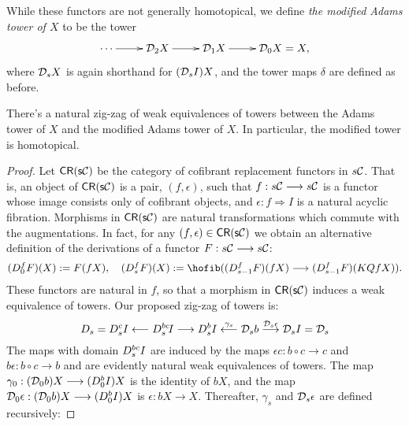 \documentclass[11pt]{amsart}
\theoremstyle{plain}
\newcommand{\caldup}[1]{\calD_{\smash{#1}}}
\begin{document}
While these functors are not generally homotopical, we define \emph{the modified Adams tower of $X$} to be the tower
\[\xymatrix@R=4mm{
\cdots 
\ar[r]
&%
\caldup{2}X
\ar[r]
&%
\caldup{1}X
\ar[r]&%
\caldup{0}X=X,
}\]
where $\caldup{s}X$ is again shorthand for $(\caldup{s}I)X$, and the tower maps $\delta$ are defined as before.
\begin{prop}\label{prop:modifiedAdamsTower}
There's a natural zig-zag of weak equivalences of towers between the Adams tower of $X$ and the modified Adams tower of $X$. In particular, the modified tower is homotopical.
\end{prop}
\begin{proof}
Let $\mathsf{CR(s\calC)}$ be the category of cofibrant replacement functors in $s\calC$. That is, an object of $\mathsf{CR(s\calC)}$ is a pair, $(f,\epsilon)$, such that $f:s\calC\to s\calC$ is a functor whose image consists only of cofibrant objects, and $\epsilon:f\Rightarrow I$ is a natural acyclic fibration. Morphisms in $\mathsf{CR(s\calC)}$ are natural transformations which commute with the augmentations. In fact, for any $(f,\epsilon)\in\mathsf{CR(s\calC)}$ we obtain an alternative definition of the derivations of a functor $F:s\calC\to s\calC$:
\begin{alignat*}{2}
(D_{\smash{0}}^{\smash{f}}F)(X)
:=
F(fX),\quad %
(D_{\smash{s}}^{\smash{f}}F)(X)
:=
\hofib((D_{\smash{s-1}}^{\smash{f}}F)(fX)\to (D_{\smash{s-1}}^{\smash{f}}F)(KQfX)).
\end{alignat*}
These functors are natural in $f$, so that a morphism in $\mathsf{CR(s\calC)}$ induces a weak equivalence of towers. Our proposed zig-zag of towers is: %
\[D_{\smash{s}}= D_{\smash{s}}^{\smash{c}}I\overset{}{\from}D_{\smash{s}}^{\smash{b\circ c}}\!I\overset{}{\to}D_{\smash{s}}^{\smash{b}}I\overset{\gamma_s}{\from}\caldup{s}b\overset{\caldup{s}\epsilon}{\to}\caldup{s}I=\caldup{s}\]
The maps with domain $D_{\smash{s}}^{\smash{b\circ c}}I$ are induced by the maps $\epsilon c:b\circ c\to c$ and $b\epsilon:b\circ c\to b$ and are evidently natural weak equivalences of towers. The map $\gamma_0:(\caldup{0}b)X\to (D_{\smash{0}}^{\smash{b}}I)X$ is the identity of $bX$, and the map $\caldup{0}\epsilon:(\caldup{0}b)X\to (D_{\smash{0}}^{\smash{b}}I)X$ is $\epsilon:bX\to X$. Thereafter, $\gamma_s$ and $\caldup{s}\epsilon$ are defined recursively:

\end{proof}
\end{document}
